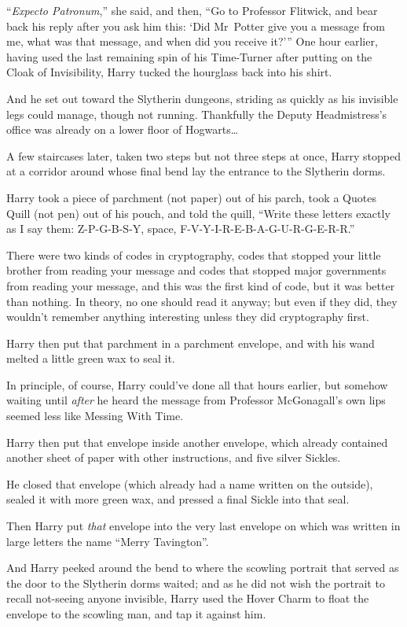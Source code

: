 “\emph{Expecto Patronum},” she said, and then, “Go to Professor Flitwick, and
bear back his reply after you ask him this: ‘Did Mr~Potter give you a message
from me, what was that message, and when did you receive it?’”
\later
One hour earlier, having used the last remaining spin of his Time-Turner after
putting on the Cloak of Invisibility, Harry tucked the hourglass back into his
shirt.

And he set out toward the Slytherin dungeons, striding as quickly as his
invisible legs could manage, though not running. Thankfully the Deputy
Headmistress’s office was already on a lower floor of Hogwarts…

A few staircases later, taken two steps but not three steps at once, Harry
stopped at a corridor around whose final bend lay the entrance to the Slytherin
dorms.

Harry took a piece of parchment (not paper) out of his parch, took a Quotes
Quill (not pen) out of his pouch, and told the quill, “Write these letters
exactly as I say them: Z-P-G-B-S-Y, space, F-V-Y-I-R-E-B-A-G-U-R-G-E-R-R.”

There were two kinds of codes in cryptography, codes that stopped your little
brother from reading your message and codes that stopped major governments from
reading your message, and this was the first kind of code, but it was better
than nothing. In theory, no one should read it anyway; but even if they did,
they wouldn’t remember anything interesting unless they did cryptography first.

Harry then put that parchment in a parchment envelope, and with his wand melted
a little green wax to seal it.

In principle, of course, Harry could’ve done all that hours earlier, but
somehow waiting until \emph{after} he heard the message from Professor
McGonagall’s own lips seemed less like Messing With Time.

Harry then put that envelope inside another envelope, which already contained
another sheet of paper with other instructions, and five silver Sickles.

He closed that envelope (which already had a name written on the outside),
sealed it with more green wax, and pressed a final Sickle into that seal.

Then Harry put \emph{that} envelope into the very last envelope on which was
written in large letters the name “Merry Tavington”.

And Harry peeked around the bend to where the scowling portrait that served as
the door to the Slytherin dorms waited; and as he did not wish the portrait to
recall not-seeing anyone invisible, Harry used the Hover Charm to float the
envelope to the scowling man, and tap it against him.

